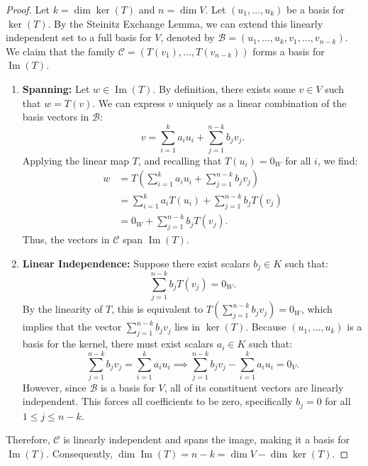 \begin{proof}
Let $k = \dim \ker(T)$ and $n = \dim V$. Let $(u_1, \dots, u_k)$ be a basis for $\ker(T)$. By the Steinitz Exchange Lemma, we can extend this linearly independent set to a full basis for $V$, denoted by $\mathcal{B} = (u_1, \dots, u_k, v_1, \dots, v_{n-k})$. We claim that the family $\mathcal{C} = (T(v_1), \dots, T(v_{n-k}))$ forms a basis for $\operatorname{Im}(T)$.

\begin{enumerate}
    \item \textbf{Spanning:} Let $w \in \operatorname{Im}(T)$. By definition, there exists some $v \in V$ such that $w = T(v)$. We can express $v$ uniquely as a linear combination of the basis vectors in $\mathcal{B}$:
    \[
    v = \sum_{i=1}^k a_i u_i + \sum_{j=1}^{n-k} b_j v_j.
    \]
    Applying the linear map $T$, and recalling that $T(u_i) = 0_W$ for all $i$, we find:
    \begin{align*}
    w &= T\left( \sum_{i=1}^k a_i u_i + \sum_{j=1}^{n-k} b_j v_j \right) \\
    &= \sum_{i=1}^k a_i T(u_i) + \sum_{j=1}^{n-k} b_j T(v_j) \\
    &= 0_W + \sum_{j=1}^{n-k} b_j T(v_j).
    \end{align*}
    Thus, the vectors in $\mathcal{C}$ span $\operatorname{Im}(T)$.
    
    \item \textbf{Linear Independence:} Suppose there exist scalars $b_j \in K$ such that:
    \[
    \sum_{j=1}^{n-k} b_j T(v_j) = 0_W.
    \]
    By the linearity of $T$, this is equivalent to $T\left( \sum_{j=1}^{n-k} b_j v_j \right) = 0_W$, which implies that the vector $\sum_{j=1}^{n-k} b_j v_j$ lies in $\ker(T)$. Because $(u_1, \dots, u_k)$ is a basis for the kernel, there must exist scalars $a_i \in K$ such that:
    \[
    \sum_{j=1}^{n-k} b_j v_j = \sum_{i=1}^k a_i u_i \implies \sum_{j=1}^{n-k} b_j v_j - \sum_{i=1}^k a_i u_i = 0_V.
    \]
    However, since $\mathcal{B}$ is a basis for $V$, all of its constituent vectors are linearly independent. This forces all coefficients to be zero, specifically $b_j = 0$ for all $1 \le j \le n-k$. 
\end{enumerate}

Therefore, $\mathcal{C}$ is linearly independent and spans the image, making it a basis for $\operatorname{Im}(T)$. Consequently, $\dim \operatorname{Im}(T) = n - k = \dim V - \dim \ker(T)$.
\end{proof}

